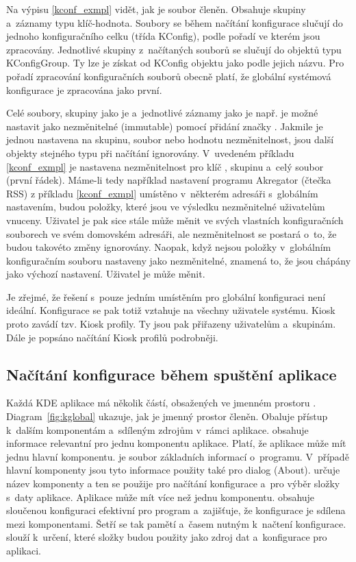 Na výpisu \ref{kconf_exmpl} vidět, jak je soubor členěn. Obsahuje skupiny a~záznamy typu klíč-hodnota. Soubory se během načítání konfigurace slučují do jednoho konfiguračního celku (třída KConfig), podle pořadí ve kterém jsou zpracovány. Jednotlivé skupiny z~načítaných souborů se slučují do objektů typu KConfigGroup. Ty lze je získat od KConfig objektu jako podle jejich názvu. Pro pořadí zpracování konfiguračních souborů obecně platí, že globální systémová konfigurace je zpracována jako první.

Celé soubory, skupiny jako je  a~jednotlivé záznamy jako je např. \linebreak{} je možné nastavit jako nezměnitelné (immutable) pomocí přidání značky \cppc{[\$i]}. Jakmile je jednou nastavena na skupinu, soubor nebo hodnotu nezměnitelnost, jsou další objekty stejného typu při načítání ignorovány. V~uvedeném příkladu \ref{kconf_exmpl} je nastavena nezměnitelnost pro klíč , skupinu  a~celý soubor (první řádek). Máme-li tedy například nastavení programu Akregator (čtečka RSS) z příkladu \ref{kconf_exmpl} umístěno v~některém adresáři s~globálním nastavením, budou položky, které jsou ve výsledku nezměnitelné uživatelům vnuceny. Uživatel je pak sice stále může měnit ve svých vlastních konfiguračních souborech ve svém domovském adresáři, ale nezměnitelnost se postará o~to, že budou takovéto změny ignorovány. Naopak, když nejsou položky v~globálním konfiguračním souboru nastaveny jako nezměnitelné, znamená to, že jsou chápány jako výchozí nastavení. Uživatel je může měnit.

Je zřejmé, že řešení s~pouze jedním umístěním pro globální konfiguraci není ideální. Konfigurace se pak totiž vztahuje na všechny uživatele systému. Kiosk proto zavádí tzv. Kiosk profily. Ty jsou pak přiřazeny uživatelům a~skupinám. Dále je popsáno načítání Kiosk profilů podrobněji.

\subsection*{Načítání konfigurace během spuštění aplikace}
Každá KDE aplikace má několik částí, obsažených ve jmenném prostoru . Diagram~\ref{fig:kglobal} ukazuje, jak je jmenný prostor  členěn. Obaluje přístup k~dalším komponentám a~sdíleným zdrojům v~rámci aplikace.  obsahuje informace relevantní pro jednu komponentu aplikace. Platí, že aplikace může mít jednu hlavní komponentu.  je soubor základních informací o~programu. V~případě hlavní komponenty jsou tyto informace použity také pro dialog  (About).  určuje název komponenty a ten se použije pro načítání konfigurace a~pro výběr složky s~daty aplikace. Aplikace může mít více než jednu komponentu.  obsahuje sloučenou konfiguraci efektivní pro program a~zajišťuje, že konfigurace je sdílena mezi komponentami. Šetří se tak pamětí a~časem nutným k~načtení konfigurace.  slouží k~určení, které složky budou použity jako zdroj dat a~konfigurace pro aplikaci.

